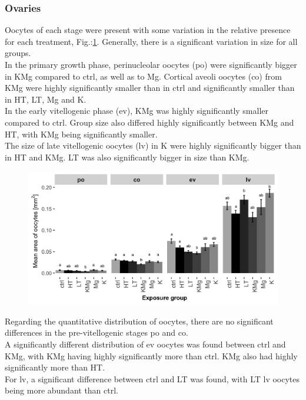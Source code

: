 \documentclass[twoside]{article}
\begin{document}
\begin{multicols}{2}
\subsubsection{Ovaries}
Oocytes of each stage were present with some variation in the relative presence for each treatment, Fig.:\ref{fig:ovo}. 
Generally, there is a significant variation in size for all groups. \\
In the primary growth phase, perinucleolar oocytes (po) were significantly bigger in KMg compared to ctrl, as well as to Mg. 
Cortical aveoli oocytes (co) from KMg were highly significantly smaller than in ctrl and significantly smaller than in HT, LT, Mg and K. \\
In the early vitellogenic phase (ev), KMg was highly significantly smaller compared to ctrl.   Group size also differed highly significantly between KMg and HT, with KMg being significantly smaller. \\
The size of late vitellogenic oocytes (lv) in K were highly significantly bigger than in HT and KMg.  LT was also significantly bigger in size than KMg.


\begin{figure}[H]
 \centering
 \includegraphics[scale=.117]{ggbarlot_ovaarea_2.png}
 \label{fig:ovo}
\end{figure}
\FloatBarrier

Regarding the quantitative distribution of oocytes, there are no significant differences in the pre-vitellogenic stages po and co.\\  A significantly different distribution of ev oocytes was found between ctrl and KMg, with KMg having highly significantly more than ctrl. KMg also had highly significantly more than HT. \\
For lv, a significant difference between ctrl and LT was found, with LT lv oocytes being more abundant than ctrl. 



\end{multicols}
\end{document}
